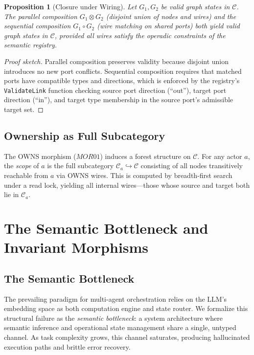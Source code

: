 \documentclass[submission,copyright,creativecommons]{eptcs}
\newtheorem{proposition}{Proposition}
\begin{document}
\begin{proposition}[Closure under Wiring]
\label{prop:closure}
Let $G_1, G_2$ be valid graph states in $\mathcal{C}$. The parallel
composition $G_1 \otimes G_2$ (disjoint union of nodes and wires) and the
sequential composition $G_1 \circ G_2$ (wire matching on shared ports) both
yield valid graph states in $\mathcal{C}$, provided all wires satisfy the
operadic constraints of the semantic registry.
\end{proposition}

\begin{proof}[Proof sketch]
Parallel composition preserves validity because disjoint union introduces no
new port conflicts. Sequential composition requires that matched ports have
compatible types and directions, which is enforced by the registry's
\texttt{ValidateLink} function checking source port direction (``out''), target
port direction (``in''), and target type membership in the source port's
admissible target set.
\end{proof}

\subsection{Ownership as Full Subcategory}

The OWNS morphism ($\mathit{MOR01}$) induces a forest structure on
$\mathcal{C}$. For any actor $a$, the \emph{scope} of $a$ is the full
subcategory $\mathcal{C}_a \hookrightarrow \mathcal{C}$ consisting of all
nodes transitively reachable from $a$ via OWNS wires. This is computed by
breadth-first search under a read lock, yielding all internal wires---those
whose source and target both lie in $\mathcal{C}_a$.



\section{The Semantic Bottleneck and Invariant Morphisms}
\label{sec:bottleneck}

\subsection{The Semantic Bottleneck}

The prevailing paradigm for multi-agent orchestration relies on the LLM's
embedding space as both computation engine and state router. We formalize this
structural failure as the \emph{semantic bottleneck}: a system architecture
where semantic inference and operational state management share a single,
untyped channel. As task complexity grows, this channel saturates, producing
hallucinated execution paths and brittle error recovery.
\end{document}
